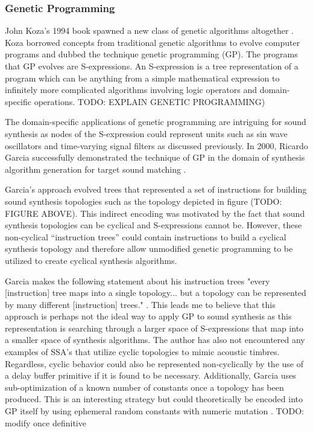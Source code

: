 \documentclass[12pt]{article}
\begin{document}
\subsubsection{Genetic Programming}
John Koza's 1994 book spawned a new class of genetic algorithms altogether \citep{koza1992genetic}. Koza borrowed concepts from traditional genetic algorithms to evolve computer programs and dubbed the technique genetic programming (GP). The programs that GP evolves are S-expressions. An S-expression is a tree representation of a program which can be anything from a simple mathematical expression to infinitely more complicated algorithms involving logic operators and domain-specific operations. TODO: EXPLAIN GENETIC PROGRAMMING)
			
The domain-specific applications of genetic programming are intriguing for sound synthesis as nodes of the S-expression could represent units such as sin wave oscillators and time-varying signal filters as discussed previously. In 2000, Ricardo Garcia successfully demonstrated the technique of GP in the domain of synthesis algorithm generation for target sound matching \citep{garcia2000towards}.

Garcia's approach evolved trees that represented a set of instructions for building sound synthesis topologies such as the topology depicted in figure (TODO: FIGURE ABOVE). This indirect encoding was motivated by the fact that sound synthesis topologies can be cyclical and S-expressions cannot be. However, these non-cyclical ``instruction trees'' could contain instructions to build a cyclical synthesis topology and therefore allow unmodified genetic programming to be utilized to create cyclical synthesis algorithms.

Garcia makes the following statement about his instruction trees "every [instruction] tree maps into a single topology... but a topology can be represented by many different [instruction] trees." \citep{garcia2012automatic}. This leads me to believe that this approach is perhaps not the ideal way to apply GP to sound synthesis as this representation is searching through a larger space of S-expressions that map into a smaller space of synthesis algorithms. The author has also not encountered any examples of SSA's that utilize cyclic topologies to mimic acoustic timbres. Regardless, cyclic behavior could also be represented non-cyclically by the use of a delay buffer primitive if it is found to be necessary. Additionally, Garcia uses sub-optimization of a known number of constants once a topology has been produced. This is an interesting strategy but could theoretically be encoded into GP itself by using ephemeral random constants with numeric mutation \citep{evett1998numeric}. TODO: modify once definitive
\end{document}
